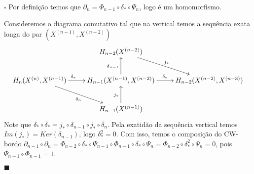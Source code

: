 \documentclass[12pt]{book}
\newenvironment{prova}[1]{$\square$ #1}{\hfill$\blacksquare$}
\newcommand{\homologiaabrev}[2]{H_{#1}(#2)}
\newcommand{\homologiarelskele}[3]{H_{#1}(X^{(#2)}, X^{(#3)})}
\newcommand{\skeleton}[1]{X^{(#1)}}
\begin{document}
	\begin{prova}
		Por definição temos que $\partial_{n} = \Phi_{n-1} \circ \delta_{*} \circ \Psi_{n}$, logo é um homomorfismo.
		
		Consideremos o diagrama comutativo tal que na vertical temos a sequência exata longa do par $(\skeleton{n-1}, \skeleton{n-2})$
		$$
		\xymatrix{
			& \homologiaabrev{n-2}{\skeleton{n-2}}\ar[rd]^{j_{*}}
			\\
			\homologiarelskele{n}{n}{n-1} \ar[r]^{\delta_{*} \qquad}\ar[rd]_{\delta_{n}} &
			\homologiarelskele{n-1}{n-1}{n-2} \ar[u]^{\delta_{n-1}} \ar[r]^{ \delta_{*}}&
			\homologiarelskele{n-2}{n-2}{n-3}
			\\
			& \homologiaabrev{n-1}{\skeleton{n-1}}\ar[u]^{j_{*}}
		}
		$$
		Note que $\delta_{*} \circ \delta_{*} = j_{*} \circ \delta_{n-1} \circ j_{*} \circ \delta_{n}$. Pela exatidão da sequência vertical temos $Im(j_{*}) = Ker(\delta_{n-1})$, logo $\delta_{*}^{2}=0$. Com isso, temos o composição do CW-bordo $\partial_{n-1}\circ \partial_{n} = \Phi_{n-2} \circ \delta_{*} \circ \Psi_{n-1} \circ \Phi_{n-1} \circ \delta_{*} \circ \Psi_{n} = \Phi_{n-2} \circ \delta_{*}^{2} \circ \Psi_{n} =0$, pois $\Psi_{n-1} \circ \Phi_{n-1}=1$.
		

\end{prova}
\end{document}

